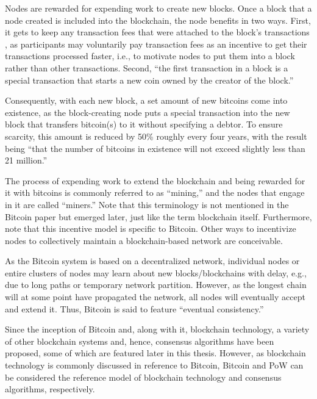 Nodes are rewarded for expending work to create new blocks.
Once a block that a node created is included into the blockchain, the node benefits in two ways.
First, it gets to keep any transaction fees that were attached to the block's transactions \autocite[4]{bitcoin2008paper}, as participants may voluntarily pay transaction fees as an incentive to get their transactions processed faster, i.e., to motivate nodes to put them into a block rather than other transactions.
Second, ``the first transaction in a block is a special transaction that starts a new coin owned by the creator of the block.'' \autocite[4]{bitcoin2008paper}

Consequently, with each new block, a set amount of new bitcoins come into existence, as the block-creating node puts a special transaction into the new block that transfers bitcoin(s) to it without specifying a debtor.
To ensure scarcity, this amount is reduced by 50\% roughly every four years, with the result being ``that the number of bitcoins in existence will not exceed slightly less than 21 million.'' \autocite{bitcoinwiki2020controlledsupply}

The process of expending work to extend the blockchain and being rewarded for it with bitcoins is commonly referred to as ``mining,'' and the nodes that engage in it are called ``miners.''
Note that this terminology is not mentioned in the Bitcoin paper but emerged later, just like the term blockchain itself.
Furthermore, note that this incentive model is specific to Bitcoin.
Other ways to incentivize nodes to collectively maintain a blockchain-based network are conceivable.

As the Bitcoin system is based on a decentralized network, individual nodes or entire clusters of nodes may learn about new blocks/blockchains with delay, e.g., due to long paths or temporary network partition.
However, as the longest chain will at some point have propagated the network, all nodes will eventually accept and extend it.
Thus, Bitcoin is said to feature ``eventual consistency.'' \autocite[35]{bashir2020}

Since the inception of Bitcoin and, along with it, blockchain technology, a variety of other blockchain systems and, hence, consensus algorithms have been proposed, some of which are featured later in this thesis.
However, as blockchain technology is commonly discussed in reference to Bitcoin, Bitcoin and PoW can be considered the reference model of blockchain technology and consensus algorithms, respectively.

